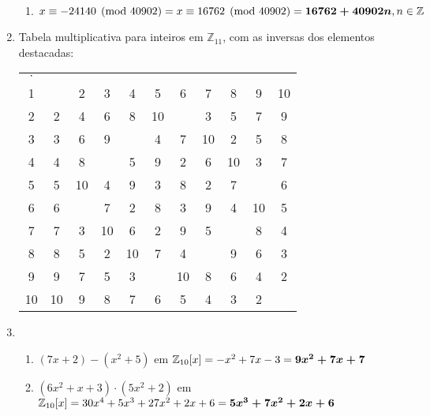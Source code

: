 \documentclass[fleqn]{article}
\begin{document}
\begin{enumerate}[label=\textbf{\arabic*})]
\begin{enumerate}
\item $x \equiv -24140 \pmod{40902} \\
= x \equiv 16762 \pmod{40902} \\
= \boldsymbol{16762 + 40902n}, n \in \mathbb{Z}$

\end{enumerate}

\item Tabela multiplicativa para inteiros em $\mathbb{Z}_{11}$, com as
inversas dos elementos destacadas:

\begin{tabular}{>{\color[gray]{0.35}}c *{10}{>{\color[gray]{0.8}}c}}
$\cdot$ & \color[gray]{0.35}{1} & \color[gray]{0.35}{2} &
\color[gray]{0.35}{3} & \color[gray]{0.35}{4} & \color[gray]{0.35}{5} &
\color[gray]{0.35}{6} & \color[gray]{0.35}{7} & \color[gray]{0.35}{8} &
\color[gray]{0.35}{9} & \color[gray]{0.35}{10} \\
1  & \color{black}{1} & 2 & 3 & 4 & 5 & 6 & 7 & 8 & 9 & 10 \\
2  & 2 & 4 & 6 & 8 & 10 & \color{black}{1} & 3 & 5 & 7 & 9 \\
3  & 3 & 6 & 9 & \color{black}{1} & 4 & 7 & 10 & 2 & 5 & 8 \\
4  & 4 & 8 & \color{black}{1} & 5 & 9 & 2 & 6 & 10 & 3 & 7 \\
5  & 5 & 10 & 4 & 9 & 3 & 8 & 2 & 7 & \color{black}{1} & 6 \\
6  & 6 & \color{black}{1} & 7 & 2 & 8 & 3 & 9 & 4 & 10 & 5 \\
7  & 7 & 3 & 10 & 6 & 2 & 9 & 5 & \color{black}{1} & 8 & 4 \\
8  & 8 & 5 & 2 & 10 & 7 & 4 & \color{black}{1} & 9 & 6 & 3 \\
9  & 9 & 7 & 5 & 3 & \color{black}{1} & 10 & 8 & 6 & 4 & 2 \\
10 & 10 & 9 & 8 & 7 & 6 & 5 & 4 & 3 & 2 & \color{black}{1} \\
\end{tabular}

\item

\begin{enumerate}

\item $(7x + 2) - (x^2 + 5)$ em $\mathbb{Z}_{10}[x] \\
= -x^2 + 7x - 3 \\
= \boldsymbol{9x^2 + 7x + 7}$

\item $(6x^2 + x + 3) \cdot (5x^2 + 2)$ em $\mathbb{Z}_{10}[x] \\
= 30x^4 + 5x^3 + 27x^2 + 2x + 6 \\
= \boldsymbol{5x^3 + 7x^2 + 2x + 6}$


\end{enumerate}
\end{enumerate}
\end{document}
